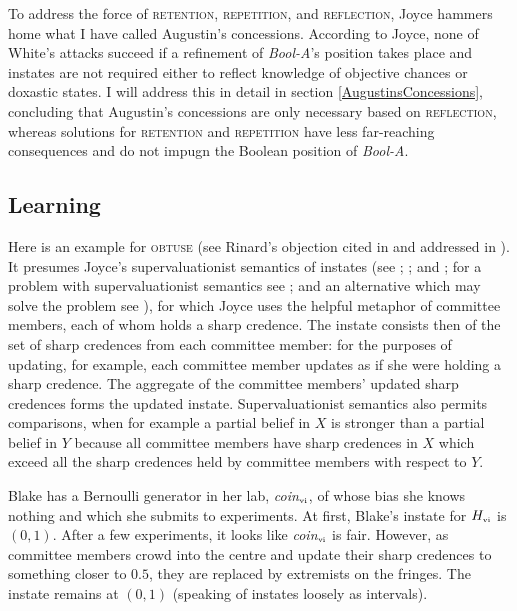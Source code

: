 \documentclass[11pt]{article}
\newcommand{\anderson}[0]{\textit{Bool-A}}
\begin{document}
To address the force of \textsc{retention}, \textsc{repetition}, and
\textsc{reflection}, Joyce hammers home what I have called Augustin's
concessions. According to Joyce, none of White's attacks succeed if a
refinement of {\anderson}'s position takes place and instates are not
required either to reflect knowledge of objective chances or doxastic
states. I will address this in detail in section
\ref{AugustinsConcessions}, concluding that Augustin's concessions are
only necessary based on \textsc{reflection}, whereas solutions for
\textsc{retention} and \textsc{repetition} have less far-reaching
consequences and do not impugn the Boolean position of {\anderson}.

\subsection{Learning}
\label{learning}

Here is an example for \textsc{obtuse} (see Rinard's objection cited
in  and addressed in ).
It presumes Joyce's supervaluationist semantics of instates (see
; ; and
; for a problem with supervaluationist semantics
see ; and an alternative which may solve the
problem see ), for which Joyce uses the
helpful metaphor of committee members, each of whom holds a sharp
credence. The instate consists then of the set of sharp credences from
each committee member: for the purposes of updating, for example, each
committee member updates as if she were holding a sharp credence. The
aggregate of the committee members' updated sharp credences forms the
updated instate. Supervaluationist semantics also permits comparisons,
when for example a partial belief in $X$ is stronger than a partial
belief in $Y$ because all committee members have sharp credences in
$X$ which exceed all the sharp credences held by committee members
with respect to $Y$.

\begin{quotex}
  \label{ex:learning} Blake has a Bernoulli
  generator in her lab, \textit{coin}$_{\mbox{\tiny{vi}}}$, of whose
  bias she knows nothing and which she submits to experiments. At
  first, Blake's instate for $H_{\mbox{\tiny{vi}}}$ is $(0,1)$. After
  a few experiments, it looks like \textit{coin}$_{\mbox{\tiny{vi}}}$
  is fair. However, as committee members crowd into the centre and
  update their sharp credences to something closer to $0.5$, they are
  replaced by extremists on the fringes. The instate remains at
  $(0,1)$ (speaking of instates loosely as intervals).
\end{quotex}
\end{document}
